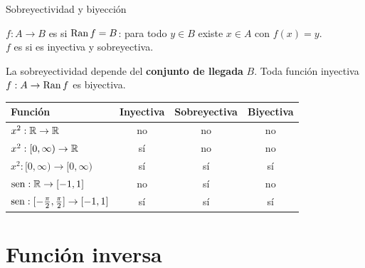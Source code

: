 \documentclass[10pt,aspectratio=169]{beamer}
\begin{document}
\begin{frame}{Sobreyectividad y biyección}
  \begin{definicion}
    $f:A\to B$ es  si $\operatorname{Ran} f=B$: para todo $y\in B$ existe $x\in A$ con $f(x)=y$.\\
    $f$ es  si es inyectiva y sobreyectiva.
  \end{definicion}
  \begin{observacion}
    La sobreyectividad depende del \textbf{conjunto de llegada} $B$. Toda función inyectiva $f:A\to\operatorname{Ran} f$ es biyectiva.
  \end{observacion}
  \begin{ejemplo}[10]
    \renewcommand{\arraystretch}{1.3}
    \begin{tabular}{l|c|c|c}
      Función & Inyectiva & Sobreyectiva & Biyectiva\\ \hline
      $x^2:\mathbb{R}\to\mathbb{R}$ & no & no & no\\
      $x^2:[0,\infty)\to\mathbb{R}$ & sí & no & no\\
      $x^2:[0,\infty)\to[0,\infty)$ & sí & sí & sí\\
      $\operatorname{sen}:\mathbb{R}\to[-1,1]$ & no & sí & no\\
      $\operatorname{sen}:[-\frac\pi2,\frac\pi2]\to[-1,1]$ & sí & sí & sí
    \end{tabular}
  \end{ejemplo}
\end{frame}

\section{Función inversa}
\end{document}

